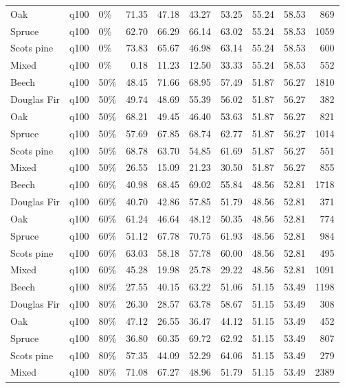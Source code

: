 \begin{longtable}{lllrrrrrrr}
  Oak & q100 & 0\% & 71.35 & 47.18 & 43.27 & 53.25 & 55.24 & 58.53 & 869 \\ 
  Spruce & q100 & 0\% & 62.70 & 66.29 & 66.14 & 63.02 & 55.24 & 58.53 & 1059 \\ 
  Scots pine & q100 & 0\% & 73.83 & 65.67 & 46.98 & 63.14 & 55.24 & 58.53 & 600 \\ 
  Mixed & q100 & 0\% & 0.18 & 11.23 & 12.50 & 33.33 & 55.24 & 58.53 & 552 \\ 
  Beech & q100 & 50\% & 48.45 & 71.66 & 68.95 & 57.49 & 51.87 & 56.27 & 1810 \\ 
  Douglas Fir & q100 & 50\% & 49.74 & 48.69 & 55.39 & 56.02 & 51.87 & 56.27 & 382 \\ 
  Oak & q100 & 50\% & 68.21 & 49.45 & 46.40 & 53.63 & 51.87 & 56.27 & 821 \\ 
  Spruce & q100 & 50\% & 57.69 & 67.85 & 68.74 & 62.77 & 51.87 & 56.27 & 1014 \\ 
  Scots pine & q100 & 50\% & 68.78 & 63.70 & 54.85 & 61.69 & 51.87 & 56.27 & 551 \\ 
  Mixed & q100 & 50\% & 26.55 & 15.09 & 21.23 & 30.50 & 51.87 & 56.27 & 855 \\ 
  Beech & q100 & 60\% & 40.98 & 68.45 & 69.02 & 55.84 & 48.56 & 52.81 & 1718 \\ 
  Douglas Fir & q100 & 60\% & 40.70 & 42.86 & 57.85 & 51.79 & 48.56 & 52.81 & 371 \\ 
  Oak & q100 & 60\% & 61.24 & 46.64 & 48.12 & 50.35 & 48.56 & 52.81 & 774 \\ 
  Spruce & q100 & 60\% & 51.12 & 67.78 & 70.75 & 61.93 & 48.56 & 52.81 & 984 \\ 
  Scots pine & q100 & 60\% & 63.03 & 58.18 & 57.78 & 60.00 & 48.56 & 52.81 & 495 \\ 
  Mixed & q100 & 60\% & 45.28 & 19.98 & 25.78 & 29.22 & 48.56 & 52.81 & 1091 \\ 
  Beech & q100 & 80\% & 27.55 & 40.15 & 63.22 & 51.06 & 51.15 & 53.49 & 1198 \\ 
  Douglas Fir & q100 & 80\% & 26.30 & 28.57 & 63.78 & 58.67 & 51.15 & 53.49 & 308 \\ 
  Oak & q100 & 80\% & 47.12 & 26.55 & 36.47 & 44.12 & 51.15 & 53.49 & 452 \\ 
  Spruce & q100 & 80\% & 36.80 & 60.35 & 69.72 & 62.92 & 51.15 & 53.49 & 807 \\ 
  Scots pine & q100 & 80\% & 57.35 & 44.09 & 52.29 & 64.06 & 51.15 & 53.49 & 279 \\ 
  Mixed & q100 & 80\% & 71.08 & 67.27 & 48.96 & 51.79 & 51.15 & 53.49 & 2389 \\ 

\end{longtable}
